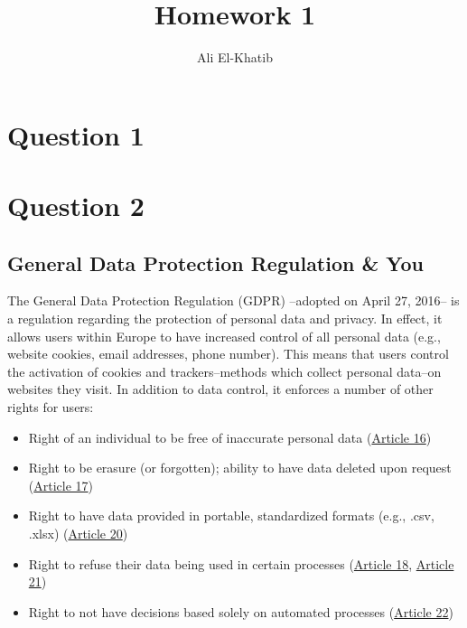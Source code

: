 \documentclass[
	letterpaper, %
]{jdf}
\author{Ali El-Khatib}
\title{Homework 1}
\begin{document}
\maketitle
\section{Question 1}

\section{Question 2}
\subsection{General Data Protection Regulation \& You}
The General Data Protection Regulation (GDPR) --adopted on April 27, 2016-- is a regulation regarding the protection of personal data and privacy. In effect, it allows users within Europe to have increased control of all personal data (e.g., website cookies, email addresses, phone number). This means that users control the activation of cookies and trackers--methods which collect personal data--on websites they visit. In addition to data control, it enforces a number of other rights for users:
\begin{itemize}
	\item Right of an individual to be free of inaccurate personal data (\href{https://gdpr-info.eu/art-16-gdpr/}{Article 16})
	\item Right to be erasure (or forgotten); ability to have data deleted upon request (\href{https://gdpr-info.eu/art-17-gdpr/}{Article 17})
	\item Right to have data provided in portable, standardized formats (e.g., .csv, .xlsx) (\href{https://gdpr-info.eu/art-20-gdpr/}{Article 20})
	\item Right to refuse their data being used in certain processes (\href{https://gdpr-info.eu/art-18-gdpr/}{Article 18}, \href{https://gdpr-info.eu/art-21-gdpr/}{Article 21})
	\item Right to not have decisions based solely on automated processes (\href{https://gdpr-info.eu/art-22-gdpr/}{Article 22})
\end{itemize}
\end{document}
